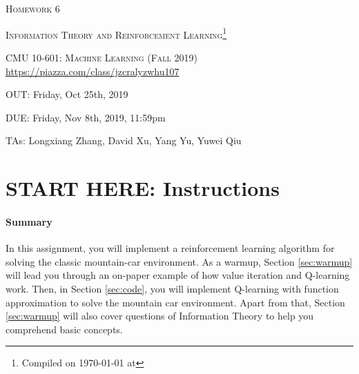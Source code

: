 \documentclass[11pt]{article}
\date{}
\numberwithin{equation}{section} %
\numberwithin{figure}{section} %
\numberwithin{table}{section} %
\begin{document}
\section*{}
\begin{center}
  \centerline{\textsc{\LARGE  Homework 6}}
  \vspace{0.5em}
  \centerline{\textsc{\LARGE Information Theory and Reinforcement Learning}\footnote{Compiled on \today{} at \currenttime{}}}
  \vspace{1em}
  \textsc{\large CMU 10-601: Machine Learning (Fall 2019)} \\
  \vspace{0.5em}
  \url{https://piazza.com/class/jzcralyzwhu107} \\
  \vspace{0.5em}
  \centerline{OUT: Friday, Oct 25th, 2019}
  \vspace{0.5em}
  \centerline{DUE: Friday, Nov 8th, 2019, 11:59pm}
    \centerline{TAs: Longxiang Zhang, David Xu, Yang Yu, Yuwei Qiu}
\end{center}

\section*{START HERE: Instructions}

\begin{notebox}
\paragraph{Summary} In this assignment, you will implement a reinforcement learning algorithm for solving the classic mountain-car environment. As a warmup, Section \ref{sec:warmup} will lead you through an on-paper example of how value iteration and Q-learning work. Then, in Section \ref{sec:code}, you will implement Q-learning with function approximation to solve the mountain car environment.
Apart from that, Section \ref{sec:warmup} will also cover questions of Information Theory to help you comprehend basic concepts.
\end{notebox}
\end{document}
